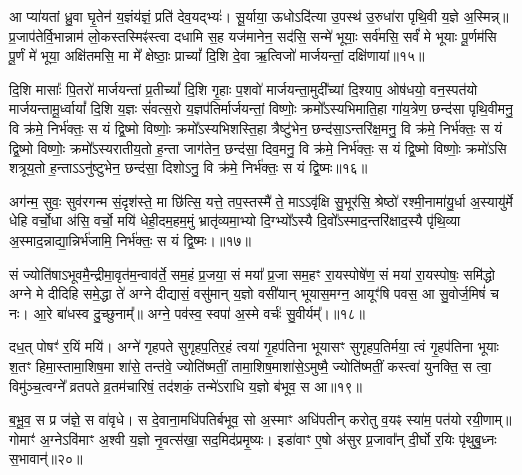 आ प्या॑यतां ध्रु॒वा घृ॒तेन॑ य॒ज्ञंय॑ज्ञं॒ प्रति॑ देव॒यद्भ्यः॑। सू॒र्याया॒ ऊधो\-ऽदि॑त्या उ॒पस्थ॑ उ॒रुधा॑रा पृथि॒वी य॒ज्ञे अ॒स्मिन्न्॥ प्र॒जाप॑तेर्वि॒भान्नाम॑ लो॒कस्तस्मिꣴ॑स्त्वा दधामि स॒ह यज॑मानेन॒ सद॑सि॒ सन्मे॑ भूयाः॒ सर्व॑मसि॒ सर्वं॑ मे भूयाः पू॒र्णम॑सि पू॒र्णं मे॑ भूया॒ अक्षि॑तमसि॒ मा मे᳚ क्षेष्ठाः॒ प्राच्यां᳚ दि॒शि दे॒वा ऋ॒त्विजो॑ मार्जयन्तां॒ दक्षि॑णायां॥१५॥

दि॒शि मासाः᳚ पि॒तरो॑ मार्जयन्तां प्र॒तीच्यां᳚ दि॒शि गृ॒हाः प॒शवो॑ मार्जयन्ता॒मुदी᳚च्यां दि॒श्याप॒ ओष॑धयो॒ वन॒स्पत॑यो मार्जयन्तामू॒र्ध्वायां᳚ दि॒शि य॒ज्ञः सं॑वत्स॒रो य॒ज्ञप॑तिर्मार्जयन्तां॒ विष्णोः॒ क्रमो᳚\-ऽस्यभिमाति॒हा गा॑य॒त्रेण॒ छन्द॑सा पृथि॒वीमनु॒ वि क्र॑मे॒ निर्भ॑क्तः॒ स यं द्वि॒ष्मो विष्णोः॒ क्रमो᳚\-ऽस्यभिशस्ति॒हा त्रैष्टु॑भेन॒ छन्द॑सा॒\-ऽन्तरि॑क्ष॒मनु॒ वि क्र॑मे॒ निर्भ॑क्तः॒ स यं द्वि॒ष्मो विष्णोः॒ क्रमो᳚\-ऽस्यरातीय॒तो ह॒न्ता जाग॑तेन॒ छन्द॑सा॒ दिव॒मनु॒ वि क्र॑मे॒ निर्भ॑क्तः॒ स यं द्वि॒ष्मो विष्णोः॒ क्रमो॑\-ऽसि शत्रूय॒तो ह॒न्ता\-ऽ\-ऽनु॑ष्टुभेन॒ छन्द॑सा॒ दिशो\-ऽनु॒ वि क्र॑मे॒ निर्भ॑क्तः॒ स यं द्वि॒ष्मः॥१६॥

{\anuvakamend[{दक्षि॑णायां द्वि॒ष्मो विष्णो॒रेका॒न्नत्रि॒ꣳ॒शच्च॑॥५॥}]}

अग॑न्म॒ सुवः॒ सुव॑रगन्म सं॒दृश॑स्ते॒ मा छि॑त्सि॒ यत्ते॒ तप॒स्तस्मै॑ ते॒ मा\-ऽ\-ऽवृ॑क्षि सु॒भूर॑सि॒ श्रेष्ठो॑ रश्मी॒नामा॑यु॒र्धा अ॒स्यायु॑र्मे धेहि वर्चो॒धा अ॑सि॒ वर्चो॒ मयि॑ धेही॒दम॒हम॒मुं भ्रातृ॑व्यमा॒भ्यो दि॒ग्भ्यो᳚\-ऽस्यै दि॒वो᳚\-ऽस्माद॒न्तरि॑क्षाद॒स्यै पृ॑थि॒व्या अ॒स्माद॒न्नाद्या॒न्निर्भ॑जामि॒ निर्भ॑क्तः॒ स यं द्वि॒ष्मः।॥१७॥

सं ज्योति॑षा\-ऽभूवमै॒न्द्रीमा॒वृत॑म॒न्वाव॑र्ते॒ सम॒हं प्र॒जया॒ सं मया᳚ प्र॒जा सम॒हꣳ रा॒यस्पोषे॑ण॒ सं मया॑ रा॒यस्पोषः॒ समि॑द्धो अग्ने मे दीदिहि समे॒द्धा ते॑ अग्ने दीद्यासं॒ वसु॑मान् य॒ज्ञो वसी॑यान् भूयास॒मग्न॒ आयूꣳ॑षि पवस॒ आ सु॒वोर्ज॒मिषं॑ च नः। आ॒रे बा॑धस्व दु॒च्छुनाम्᳚॥ अग्ने॒ पव॑स्व॒ स्वपा॑ अ॒स्मे वर्चः॑ सु॒वीर्यम्᳚।॥१८॥

दध॒त् पोषꣳ॑ र॒यिं मयि॑। अग्ने॑ गृहपते सुगृहप॒तिर॒हं त्वया॑ गृ॒हप॑तिना भूयासꣳ सुगृहप॒तिर्मया॒ त्वं गृ॒हप॑तिना भूयाः श॒तꣳ हिमा॒स्तामा॒शिष॒मा शा॑से॒ तन्त॑वे॒ ज्योति॑ष्मतीं॒ तामा॒शिष॒माशा॑से॒\-ऽमुष्मै॒ ज्योति॑ष्मतीं॒ कस्त्वा॑ युनक्ति॒ स त्वा॒ विमु॑ञ्च॒त्वग्ने᳚ व्रतपते व्र॒तम॑चारिषं॒ तद॑शकं॒ तन्मे॑\-ऽराधि य॒ज्ञो ब॑भूव॒ स आ॥१९॥

ब॒भू॒व॒ स प्र ज॑ज्ञे॒ स वा॑वृधे। स दे॒वाना॒मधि॑पतिर्बभूव॒ सो अ॒स्माꣳ अधि॑पतीन् करोतु व॒यꣴ स्या॑म॒ पत॑यो रयी॒णाम्॥ गोमाꣳ॑ अ॒ग्ने\-ऽवि॑माꣳ अ॒श्वी य॒ज्ञो नृ॒वत्स॑खा॒ सद॒मिद॑प्रमृ॒ष्यः। इडा॑वाꣳ ए॒षो अ॑सुर प्र॒जावा᳚न् दी॒र्घो र॒यिः पृ॑थुबु॒ध्नः स॒भावान्॑॥२०॥

